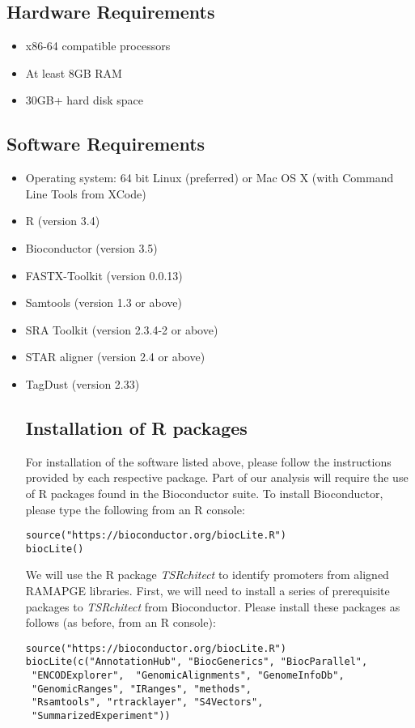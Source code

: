 \documentclass[runningheads,a4paper]{llncs}
\begin{document}
\begin{linenumbers}
\subsection{Hardware Requirements}
\begin{itemize} 
\item x86-64 compatible processors
\item At least 8GB RAM
\item 30GB+ hard disk space
\end{itemize}

\subsection{Software Requirements}
\begin{itemize}
\item Operating system: 64 bit Linux (preferred) or Mac OS X (with Command Line Tools from XCode)
\item R (version 3.4) 
\item Bioconductor (version 3.5)
\item FASTX-Toolkit (version 0.0.13)
\item Samtools (version 1.3 or above)
\item SRA Toolkit (version 2.3.4-2 or above)
\item STAR aligner (version 2.4 or above)
\item TagDust (version 2.33)

\subsection{Installation of R packages}
For installation of the software listed above, please follow the instructions provided by each respective package. 
Part of our analysis will require the use of R packages found in the Bioconductor suite.
To install Bioconductor, please type the following from an R console: 

\noindent
\begin{verbatim}
source("https://bioconductor.org/biocLite.R")
biocLite()
\end{verbatim}

We will use the R package \textit{TSRchitect} to identify promoters from aligned RAMAPGE libraries. 
First, we will need to install a series of prerequisite packages to \textit{TSRchitect} from Bioconductor.
Please install these packages as follows (as before, from an R console):

\noindent
\begin{verbatim}
source("https://bioconductor.org/biocLite.R")
biocLite(c("AnnotationHub", "BiocGenerics", "BiocParallel",
 "ENCODExplorer",  "GenomicAlignments", "GenomeInfoDb",
 "GenomicRanges", "IRanges", "methods", 
 "Rsamtools", "rtracklayer", "S4Vectors",
 "SummarizedExperiment"))
\end{verbatim}


\end{itemize}
\end{linenumbers}
\end{document}
